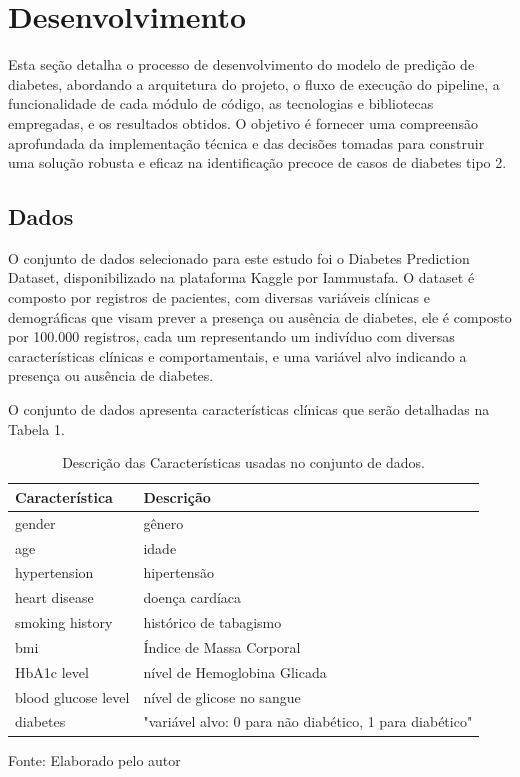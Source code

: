 
\chapter{Desenvolvimento}
Esta seção detalha o processo de desenvolvimento do modelo de predição de diabetes, abordando a arquitetura do projeto, o fluxo de execução do pipeline, a funcionalidade de cada módulo de código, as tecnologias e bibliotecas empregadas, e os resultados obtidos. O objetivo é fornecer uma compreensão aprofundada da implementação técnica e das decisões tomadas para construir uma solução robusta e eficaz na identificação precoce de casos de diabetes tipo 2.

\section{Dados}
O conjunto de dados selecionado para este estudo foi o Diabetes Prediction Dataset, disponibilizado na plataforma Kaggle por Iammustafa\cite{Iammustafa2022}. O dataset é composto por registros de pacientes, com diversas variáveis clínicas e demográficas que visam prever a presença ou ausência de diabetes, ele é composto por 100.000 registros, cada um representando um indivíduo com diversas características clínicas e comportamentais, e uma variável alvo indicando a presença ou ausência de diabetes.

O conjunto de dados apresenta características clínicas que serão detalhadas na Tabela 1. 

\begin{table}[H]
    \centering
    \caption{Descrição das Características usadas no conjunto de dados.}
    \label{tab:features}
    \begin{tabular}{@{}ll@{}}
        \toprule
        \textbf{Característica} & \textbf{Descrição} \\
        \midrule
        gender & gênero \\
        age & idade \\
        hypertension & hipertensão \\
        heart disease & doença cardíaca \\
        smoking history & histórico de tabagismo \\
        bmi & Índice de Massa Corporal \\
        HbA1c level & nível de Hemoglobina Glicada \\
        blood glucose level & nível de glicose no sangue \\
        diabetes & "variável alvo: 0 para não diabético, 1 para diabético" \\
        \bottomrule
    \end{tabular}
     \par 
     \small Fonte: Elaborado pelo autor
\end{table}


